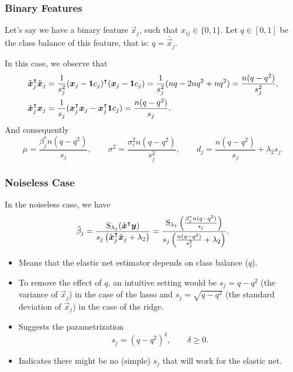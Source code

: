 \documentclass[10pt]{beamer}
\begin{document}
\begin{frame}[c]
  \frametitle{Binary Features}

  Let's say we have a binary feature \(\vec{x}_j\), such that \(x_{ij} \in \{0, 1\}\). Let
  \(q \in [0, 1]\) be the class balance of this feature, that is: \(q = \bar{\vec{x}}_j\).

  \bigskip

  In this case, we observe that
  \[
    \begin{aligned}
      \tilde{\boldsymbol{x}}_j^\intercal \tilde{\boldsymbol{x}}_j & = \frac{1}{s_j^2}(\boldsymbol{x}_j - \boldsymbol{1} c_j)^\intercal (\boldsymbol{x}_j - \boldsymbol{1} c_j) = \frac{1}{s^2_j}(nq - 2nq^2 + nq^2) = \frac{n(q-q^2)}{s^2_j}, \\
      \tilde{\boldsymbol{x}}_j^\intercal \boldsymbol{x}_j         & = \frac{1}{s_j}(\boldsymbol{x}_j^\intercal \boldsymbol{x}_j - \boldsymbol{x}_j^\intercal \boldsymbol{1} c_j) = \frac{n(q - q^2)}{s_j}.
    \end{aligned}
  \]
  \pause%
  And consequently
  \[
    \mu = \frac{\beta^*_j n(q - q^2)}{s_j}, \qquad \sigma^2 = \frac{\sigma_\varepsilon^2n(q - q^2)}{s^2_j}, \qquad d_j = \frac{n(q -q^2)}{s_j}  + \lambda_2 s_j.
  \]
\end{frame}

\begin{frame}[c]
  \frametitle{Noiseless Case}

  In the noiseless case, we have
  \[
    \hat{\beta}_j = \frac{\operatorname{S}_{\lambda_1}(\tilde{\boldsymbol{x}}^\intercal \boldsymbol{y})}{s_j\left(\tilde{\boldsymbol{x}}_j^\intercal \tilde{\boldsymbol{x}}_j + \lambda_2\right)}
    =
    \frac{\operatorname{S}_{\lambda_1}\left(\frac{\beta_j^* n (q - q^2)}{s_j}\right)}{s_j\left(\frac{n(q - q^2)}{s_j^2} + \lambda_2\right)}.
  \]
  \pause
  \begin{itemize}[<+->]
    \item Means that the elastic net estimator depends on class balance (\(q\)).
    \item To remove the effect of \(q\), an intuitive setting would be \(s_j = q - q^2\) (the
          variance of \(\vec{x}_j\)) in the case of the lasso and \(s_j = \sqrt{q-q^2}\) (the
          standard deviation of \(\vec{x}_j\)) in the case of the ridge.
    \item Suggests the parametrization
          \[
            s_j = (q - q^2)^\delta, \qquad \delta \geq 0.
          \]
    \item Indicates there might be no (simple) \(s_j\) that will work for the elastic net.
  \end{itemize}
\end{frame}
\end{document}
